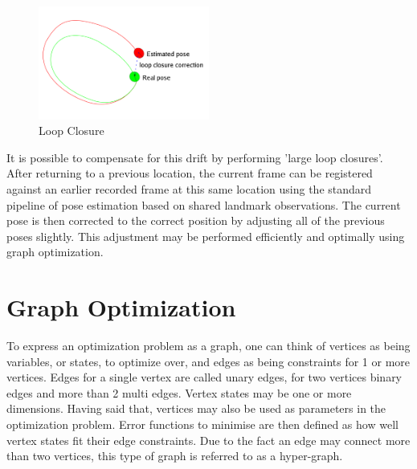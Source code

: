 \begin{figure}[h]
  \centering
    \includegraphics[width=0.5\textwidth]{chapters/images/loop-closure}
  \caption{Loop Closure}
  \label{fig:loop_closure}
\end{figure}

It is possible to compensate for this drift by performing 'large loop closures'. After returning to a previous location, the current frame can be registered against an earlier recorded frame at this same location using the standard pipeline of pose estimation based on shared landmark observations.  The current pose is then corrected to the correct position by adjusting all of the previous poses slightly.  This adjustment may be performed efficiently and optimally using graph optimization.

\section{Graph Optimization}
\label{subsec:graph_slam}

To express an optimization problem as a graph, one can think of vertices as being variables, or states, to optimize over, and edges as being constraints for 1 or more vertices.  Edges for a single vertex are called unary edges, for two vertices binary edges and more than 2 multi edges.  Vertex states may be one or more dimensions.  Having said that, vertices may also be used as parameters in the optimization problem.  Error functions to minimise are then defined as how well vertex states fit their edge constraints.  Due to the fact an edge may connect more than two vertices, this type of graph is referred to as a hyper-graph.

